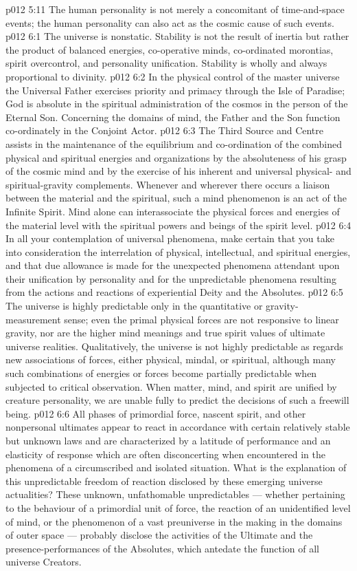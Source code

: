 \vs p012 5:11 The human personality is not merely a concomitant of time\hyp{}and\hyp{}space events; the human personality can also act as the cosmic cause of such events.
\vs p012 6:1 The universe is nonstatic. Stability is not the result of inertia but rather the product of balanced energies, co\hyp{}operative minds, co\hyp{}ordinated morontias, spirit overcontrol, and personality unification. Stability is wholly and always proportional to divinity.
\vs p012 6:2 In the physical control of the master universe the Universal Father exercises priority and primacy through the Isle of Paradise; God is absolute in the spiritual administration of the cosmos in the person of the Eternal Son. Concerning the domains of mind, the Father and the Son function co\hyp{}ordinately in the Conjoint Actor.
\vs p012 6:3 The Third Source and Centre assists in the maintenance of the equilibrium and co\hyp{}ordination of the combined physical and spiritual energies and organizations by the absoluteness of his grasp of the cosmic mind and by the exercise of his inherent and universal physical\hyp{} and spiritual\hyp{}gravity complements. Whenever and wherever there occurs a liaison between the material and the spiritual, such a mind phenomenon is an act of the Infinite Spirit. Mind alone can interassociate the physical forces and energies of the material level with the spiritual powers and beings of the spirit level.
\vs p012 6:4 In all your contemplation of universal phenomena, make certain that you take into consideration the interrelation of physical, intellectual, and spiritual energies, and that due allowance is made for the unexpected phenomena attendant upon their unification by personality and for the unpredictable phenomena resulting from the actions and reactions of experiential Deity and the Absolutes.
\vs p012 6:5 The universe is highly predictable only in the quantitative or gravity\hyp{}measurement sense; even the primal physical forces are not responsive to linear gravity, nor are the higher mind meanings and true spirit values of ultimate universe realities. Qualitatively, the universe is not highly predictable as regards new associations of forces, either physical, mindal, or spiritual, although many such combinations of energies or forces become partially predictable when subjected to critical observation. When matter, mind, and spirit are unified by creature personality, we are unable fully to predict the decisions of such a freewill being.
\vs p012 6:6 \pc All phases of primordial force, nascent spirit, and other nonpersonal ultimates appear to react in accordance with certain relatively stable but unknown laws and are characterized by a latitude of performance and an elasticity of response which are often disconcerting when encountered in the phenomena of a circumscribed and isolated situation. What is the explanation of this unpredictable freedom of reaction disclosed by these emerging universe actualities? These unknown, unfathomable unpredictables --- whether pertaining to the behaviour of a primordial unit of force, the reaction of an unidentified level of mind, or the phenomenon of a vast preuniverse in the making in the domains of outer space --- probably disclose the activities of the Ultimate and the presence\hyp{}performances of the Absolutes, which antedate the function of all universe Creators.
